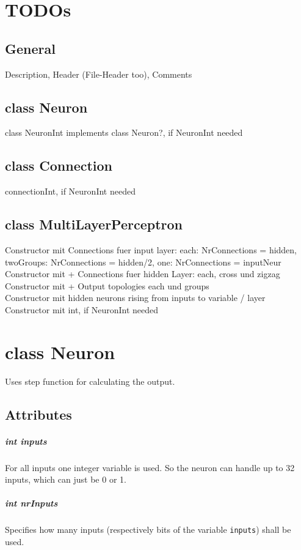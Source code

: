 \chapter{TODOs}
\section{General}
Description, Header (File-Header too), Comments

\section{class Neuron}
class NeuronInt implements class Neuron?, if NeuronInt needed

\section{class Connection}
connectionInt, if NeuronInt needed

\section{class MultiLayerPerceptron}
Constructor mit Connections fuer input layer: each: NrConnections = hidden, twoGroups: NrConnections = hidden/2, one: NrConnections = inputNeur\\
Constructor mit + Connections fuer hidden Layer: each, cross und zigzag\\
Constructor mit + Output topologies each und groups\\
Constructor mit hidden neurons rising from inputs to variable / layer\\
Constructor mit int, if NeuronInt needed

\chapter{class Neuron}
Uses step function for calculating the output.

\section{Attributes}
\paragraph{int inputs}
For all inputs one integer variable is used. So the neuron can handle up to 32 inputs, which can just be 0 or 1.

\paragraph{int nrInputs}
Specifies how many inputs (respectively bits of the variable \texttt{inputs}) shall be used.

